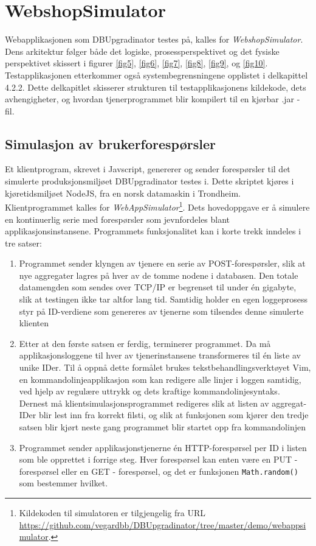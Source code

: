 \section{WebshopSimulator} \label{prog}

Webapplikasjonen som DBUpgradinator testes på, kalles for \emph{WebshopSimulator}. Dens arkitektur følger både det logiske, prosessperspektivet og det fysiske perspektivet skissert i figurer \ref{fig5}, \ref{fig6}, \ref{fig7}, \ref{fig8}, \ref{fig9}, og \ref{fig10}. Testapplikasjonen etterkommer også systembegrensningene opplistet i delkapittel 4.2.2. Dette delkapitlet skisserer strukturen til testapplikasjonens kildekode, dets avhengigheter, og hvordan tjenerprogrammet blir kompilert til en kjørbar .jar - fil.

\subsection{Simulasjon av brukerforespørsler}

Et klientprogram, skrevet i Javscript, genererer og sender forespørsler til det simulerte produksjonsmiljøet DBUpgradinator testes i. Dette skriptet kjøres i kjøretidsmiljøet NodeJS, fra en norsk datamaskin i Trondheim. Klientprogrammet kalles for \emph{WebAppSimulator}\footnote{Kildekoden til simulatoren er tilgjengelig fra URL \url{https://github.com/vegardbb/DBUpgradinator/tree/master/demo/webappsimulator}.}. Dets hovedoppgave er å simulere en kontinuerlig serie med forespørsler som jevnfordeles blant applikasjonsinstansene. Programmets funksjonalitet kan i korte trekk inndeles i tre satser:

\begin{enumerate}
  \item Programmet sender klyngen av tjenere en serie av POST-forespørsler, slik at nye aggregater lagres på hver av de tomme nodene i databasen. Den totale datamengden som sendes over TCP/IP er begrenset til under én gigabyte, slik at testingen ikke tar altfor lang tid. Samtidig holder en egen loggeprosess styr på ID-verdiene som genereres av tjenerne som tilsendes denne simulerte klienten
  \item Etter at den første satsen er ferdig, terminerer programmet. Da må applikasjonsloggene til hver av tjenerinstansene transformeres til én liste av unike IDer. Til å oppnå dette formålet brukes tekstbehandlingsverktøyet Vim, en kommandolinjeapplikasjon som kan redigere alle linjer i loggen samtidig, ved hjelp av regulære uttrykk og dets kraftige kommandolinjesyntaks. Dernest må klientsimulasjonsprogrammet redigeres slik at listen av aggregat-IDer blir lest inn fra korrekt filsti, og slik at funksjonen som kjører den tredje satsen blir kjørt neste gang programmet blir startet opp fra kommandolinjen
  \item Programmet sender applikasjonstjenerne én HTTP-forespørsel per ID i listen som ble opprettet i forrige steg. Hver forespørsel kan enten være en PUT - forespørsel eller en GET - forespørsel, og det er funksjonen \texttt{Math.random()} som bestemmer hvilket.
\end{enumerate}

